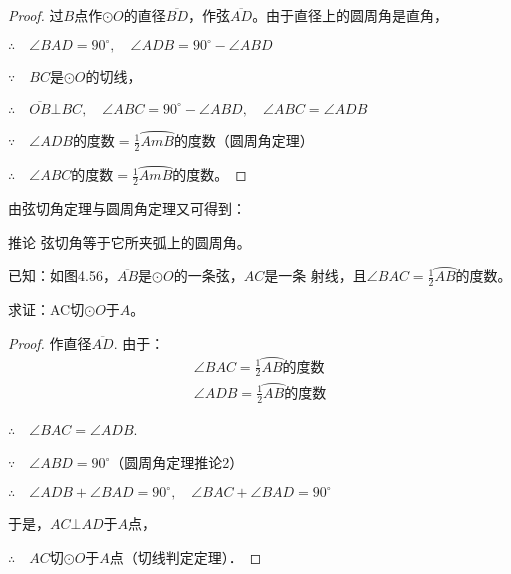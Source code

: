   \begin{proof}
  过$B$点作$\odot O$的直径$\overline{BD}$，作弦$\overline{AD}$。由于直径上的圆周角是直角，
  
  $\therefore\quad \angle BAD=90^{\circ},\quad \angle ADB=90^{\circ}-\angle ABD$
  
  $\because\quad BC$是$\odot O$的切线，
  
  $\therefore\quad \overline{OB}\bot BC,\quad \angle ABC=90^{\circ}-\angle ABD,\quad \angle ABC=\angle ADB$
  
  $\because\quad \angle ADB$的度数$=\frac{1}{2}\wideparen{AmB}$的度数（圆周角定理）
  
  $\therefore\quad \angle ABC$的度数$=\frac{1}{2}\wideparen{AmB}$的度数。
  \end{proof}
  
    由弦切角定理与圆周角定理又可得到：
    
  \begin{blk}
    {推论} 弦切角等于它所夹弧上的圆周角。
  \end{blk}
  
  \begin{example}
    已知：如图4.56，$\overline{AB}$是$\odot O$的一条弦，$AC$是一条
    射线，且$\angle BAC=\frac{1}{2}\wideparen{AB}$的度数。
  
    求证：AC切$\odot O$于$A$。
  \end{example}
  
  \begin{proof}
  作直径$\overline{AD}$. 由于：
  \begin{align*}
    \angle BAC=\frac{1}{2}\wideparen{AB}\text{的度数}\tag{已知}\\
    \angle ADB=\frac{1}{2}\wideparen{AB}\text{的度数}\tag{圆周角定理}
  \end{align*}
  
  $\therefore\quad \angle BAC = \angle ADB$.
  
  $\because\quad \angle ABD=90^{\circ}$（圆周角定理推论2）
  
  $\therefore\quad \angle ADB+\angle BAD=90^{\circ},\quad \angle BAC+\angle BAD=90^{\circ}$
  
  于是，$AC\bot AD$于$A$点，
  
  $\therefore\quad AC$切$\odot O$于$A$点（切线判定定理）．  
  \end{proof}
  
